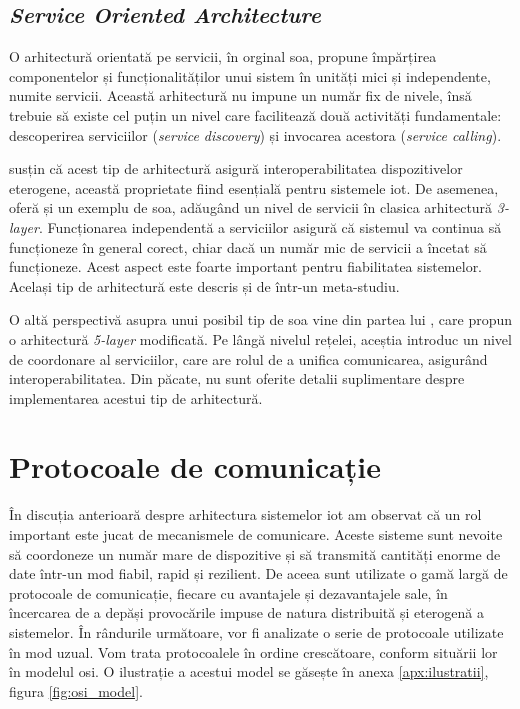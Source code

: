 \subsection*{\textit{Service Oriented Architecture}}

O arhitectură orientată pe servicii, în orginal \acrfull{soa}, propune împărțirea componentelor și funcționalităților unui sistem în unități mici și independente, numite servicii. Această arhitectură nu impune un număr fix de nivele, însă trebuie să existe cel puțin un nivel care facilitează două activități fundamentale: descoperirea serviciilor (\textit{service discovery}) și invocarea acestora (\textit{service calling}). 

\citet{Khodadadi2016} susțin că acest tip de arhitectură asigură interoperabilitatea dispozitivelor eterogene, această proprietate fiind esențială pentru sistemele \acrshort{iot}. De asemenea, oferă și un exemplu de \acrshort{soa}, adăugând un nivel de servicii în clasica arhitectură \textit{3-layer}. Funcționarea independentă a serviciilor asigură că sistemul va continua să funcționeze în general corect, chiar dacă un număr mic de servicii a încetat să funcționeze. Acest aspect este foarte important pentru fiabilitatea sistemelor. Același tip de arhitectură este descris și de \citet{Lin2017} într-un meta-studiu.

O altă perspectivă asupra unui posibil tip de \acrshort{soa} vine din partea lui \citet{LuTan2010}, care propun o arhitectură \textit{5-layer} modificată. Pe lângă nivelul rețelei, aceștia introduc un nivel de coordonare al serviciilor, care are rolul de a unifica comunicarea, asigurând interoperabilitatea. Din păcate, nu sunt oferite detalii suplimentare despre implementarea acestui tip de arhitectură.

\section{Protocoale de comunicație}

În discuția anterioară despre arhitectura sistemelor \acrshort{iot} am observat că un rol important este jucat de mecanismele de comunicare. Aceste sisteme sunt nevoite să coordoneze un număr mare de dispozitive și să transmită cantități enorme de date într-un mod fiabil, rapid și rezilient. De aceea sunt utilizate o gamă largă de protocoale de comunicație, fiecare cu avantajele și dezavantajele sale, în încercarea de a depăși provocările impuse de natura distribuită și eterogenă a sistemelor. În rândurile următoare, vor fi analizate o serie de protocoale utilizate în mod uzual. Vom trata protocoalele în ordine crescătoare, conform situării lor în modelul \acrshort{osi}. O ilustrație a acestui model se găsește în anexa \ref{apx:ilustratii}, figura \ref{fig:osi_model}.

